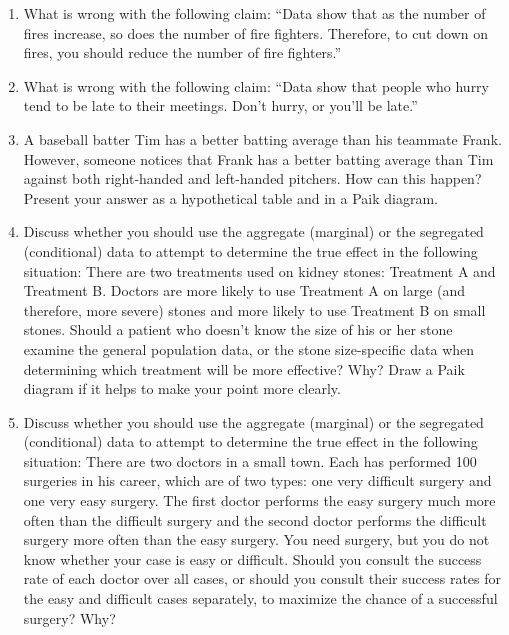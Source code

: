 \documentclass[
]{article}
\begin{document}
\begin{enumerate}
\item
  What is wrong with the following claim: ``Data show that as the number
  of fires increase, so does the number of fire fighters. Therefore, to
  cut down on fires, you should reduce the number of fire fighters.''
  \vspace{0px}
\item
  What is wrong with the following claim: ``Data show that people who
  hurry tend to be late to their meetings. Don't hurry, or you'll be
  late.'' \vspace{0px}
\item
  A baseball batter Tim has a better batting average than his teammate
  Frank. However, someone notices that Frank has a better batting
  average than Tim against both right-handed and left-handed pitchers.
  How can this happen? Present your answer as a hypothetical table and
  in a Paik diagram. \vspace{0px}
\item
  Discuss whether you should use the aggregate (marginal) or the
  segregated (conditional) data to attempt to determine the true effect
  in the following situation: There are two treatments used on kidney
  stones: Treatment A and Treatment B. Doctors are more likely to use
  Treatment A on large (and therefore, more severe) stones and more
  likely to use Treatment B on small stones. Should a patient who
  doesn't know the size of his or her stone examine the general
  population data, or the stone size-specific data when determining
  which treatment will be more effective? Why? Draw a Paik diagram if it
  helps to make your point more clearly. \vspace{0px}
\item
  Discuss whether you should use the aggregate (marginal) or the
  segregated (conditional) data to attempt to determine the true effect
  in the following situation: There are two doctors in a small town.
  Each has performed 100 surgeries in his career, which are of two
  types: one very difficult surgery and one very easy surgery. The first
  doctor performs the easy surgery much more often than the difficult
  surgery and the second doctor performs the difficult surgery more
  often than the easy surgery. You need surgery, but you do not know
  whether your case is easy or difficult. Should you consult the success
  rate of each doctor over all cases, or should you consult their
  success rates for the easy and difficult cases separately, to maximize
  the chance of a successful surgery? Why? \vspace{0px}

\end{enumerate}
\end{document}

